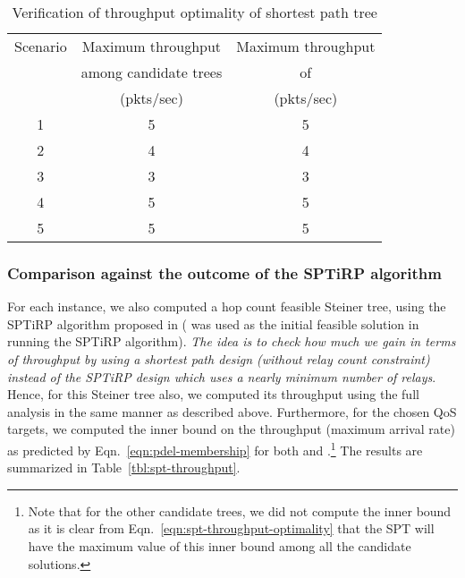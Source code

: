 \documentclass[12pt, draftclsnofoot, onecolumn]{IEEEtran}
\begin{document}
\begin{table*}[ht]
  \centering
\caption{Verification of throughput optimality of shortest path tree}
\label{tbl:throughput-optimality}
\footnotesize
  \begin{tabular}{|c|c|c|}\hline
    Scenario & Maximum throughput & Maximum throughput\\
             & among candidate trees & of \\
             & (pkts/sec) & (pkts/sec) \\
              
 \hline
    1 & 5  & 5\\
 \hline
    2 & 4 & 4\\
 \hline
    3 & 3 & 3\\
 \hline
    4 & 5 & 5\\
 \hline
    5 & 5 & 5\\
\hline
\end{tabular}
\normalsize
\end{table*}

\subsubsection{Comparison against the outcome of the SPTiRP algorithm\cite{bhattacharya-kumar14comnet}}
\label{subsubsec:comparison-against-sptirp}

For each instance, we also computed a hop count feasible Steiner tree,  using the SPTiRP algorithm proposed in \cite{bhattacharya-kumar14comnet} ( was used as the initial feasible solution in running the SPTiRP algorithm). \emph{The idea is to check how much we gain in terms of throughput by using a shortest path design (without relay count constraint) instead of the SPTiRP design which uses a nearly minimum number of relays}. Hence, for this Steiner tree also, we computed its throughput using the full analysis in the same manner as described above. Furthermore, for the chosen QoS targets, we computed the inner bound on the throughput (maximum arrival rate) as predicted by Eqn.~\ref{eqn:pdel-membership} for both  and .\footnote{Note that for the other candidate trees, we did not compute the inner bound as it is clear from Eqn.~\ref{eqn:spt-throughput-optimality} that the SPT will have the maximum value of this inner bound among all the candidate solutions.} The results are summarized in Table~\ref{tbl:spt-throughput}. 
\end{document}
